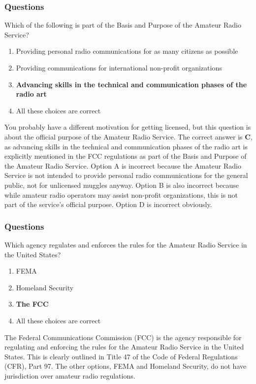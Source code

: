 \subsubsection*{Questions}
\begin{tcolorbox}[colback=gray!10!white,colframe=black!75!black,title={T1A01}]
    Which of the following is part of the Basis and Purpose of the Amateur Radio Service?
    \begin{enumerate}[label=\Alph*),noitemsep]
        \item Providing personal radio communications for as many citizens as possible
        \item Providing communications for international non-profit organizations
        \item \textbf{Advancing skills in the technical and communication phases of the radio art}
        \item All these choices are correct
    \end{enumerate}
\end{tcolorbox}

You probably have a different motivation for getting licensed, but this question is about the official purpose of the Amateur Radio Service.
The correct answer is \textbf{C}, as advancing skills in the technical and communication phases of the radio art is explicitly mentioned in the FCC regulations as part of the Basis and Purpose of the Amateur Radio Service. Option A is incorrect because the Amateur Radio Service is not intended to provide personal radio communications for the general public, not for unlicensed muggles anyway. Option B is also incorrect because while amateur radio operators may assist non-profit organizations, this is not part of the service's official purpose. Option D is incorrect obviously.



\subsubsection*{Questions}

\begin{tcolorbox}[colback=gray!10!white,colframe=black!75!black,title={T1A02}]
    Which agency regulates and enforces the rules for the Amateur Radio Service in the United States?
    \begin{enumerate}[label=\Alph*),noitemsep]
        \item FEMA
        \item Homeland Security
        \item \textbf{The FCC}
        \item All these choices are correct
    \end{enumerate}
\end{tcolorbox}

The Federal Communications Commission (FCC) is the agency responsible for regulating and enforcing the rules for the Amateur Radio Service in the United States. This is clearly outlined in Title 47 of the Code of Federal Regulations (CFR), Part 97. The other options, FEMA and Homeland Security, do not have jurisdiction over amateur radio regulations. 
